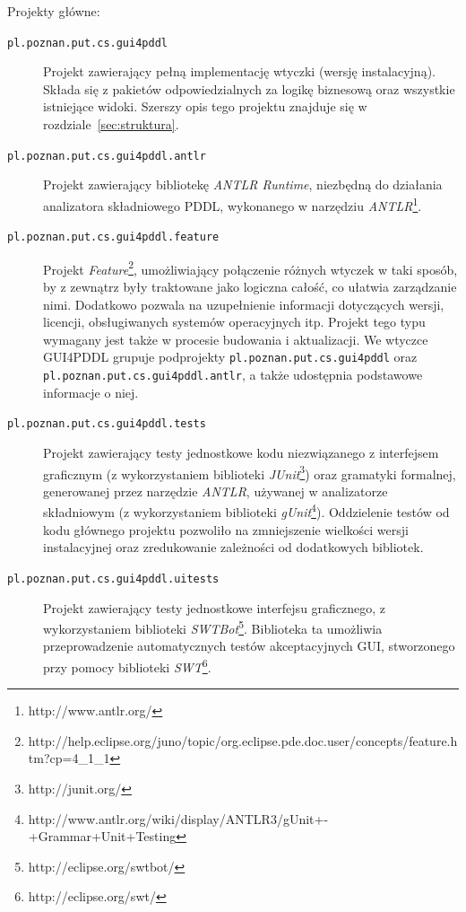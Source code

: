 Projekty główne:
\begin{description}
\item [\texttt{pl.poznan.put.cs.gui4pddl}] Projekt zawierający pełną implementację wtyczki (wersję instalacyjną). Składa się z pakietów odpowiedzialnych za logikę biznesową oraz wszystkie istniejące widoki. Szerszy opis tego projektu znajduje się w rozdziale~\ref{sec:struktura}.
\item [\texttt{pl.poznan.put.cs.gui4pddl.antlr}] Projekt zawierający bibliotekę \emph{ANTLR Runtime}, niezbędną do działania analizatora składniowego PDDL, wykonanego w narzędziu \emph{ANTLR}\footnote{http://www.antlr.org/}.
\item [\texttt{pl.poznan.put.cs.gui4pddl.feature}] Projekt \emph{Feature}\footnote{http://help.eclipse.org/juno/topic/org.eclipse.pde.doc.user/concepts/feature.htm?cp=4\_1\_1}, umożliwiający połączenie różnych wtyczek w taki sposób, by z zewnątrz były traktowane jako logiczna całość, co ułatwia zarządzanie nimi. Dodatkowo pozwala na uzupełnienie informacji dotyczących wersji, licencji, obsługiwanych systemów operacyjnych itp. Projekt tego typu wymagany jest także w procesie budowania i aktualizacji. We wtyczce GUI4PDDL grupuje podprojekty \texttt{pl.poznan.put.cs.gui4pddl} oraz \texttt{pl.poznan.put.cs.gui4pddl.antlr}, a także udostępnia podstawowe informacje o niej.
\item [\texttt{pl.poznan.put.cs.gui4pddl.tests}] Projekt zawierający testy jednostkowe kodu niezwiązanego z interfejsem graficznym (z wykorzystaniem biblioteki \emph{JUnit}\footnote{http://junit.org/}) oraz gramatyki formalnej, generowanej przez narzędzie \emph{ANTLR}, używanej w analizatorze składniowym (z wykorzystaniem biblioteki \emph{gUnit}\footnote{http://www.antlr.org/wiki/display/ANTLR3/gUnit+-+Grammar+Unit+Testing}). Oddzielenie testów od kodu głównego projektu pozwoliło na zmniejszenie wielkości wersji instalacyjnej oraz zredukowanie zależności od dodatkowych bibliotek.
\item [\texttt{pl.poznan.put.cs.gui4pddl.uitests}] Projekt zawierający testy jednostkowe interfejsu graficznego, z wykorzystaniem biblioteki \emph{SWTBot}\footnote{http://eclipse.org/swtbot/}. Biblioteka ta umożliwia przeprowadzenie automatycznych testów akceptacyjnych GUI, stworzonego przy pomocy biblioteki \emph{SWT}\footnote{http://eclipse.org/swt/}.

\end{description}
